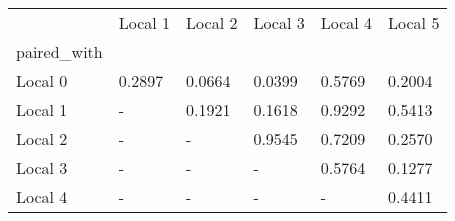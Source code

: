 \begin{tabular}{llllll}
\toprule
 & Local 1 & Local 2 & Local 3 & Local 4 & Local 5 \\
paired_with &  &  &  &  &  \\
\midrule
Local 0 & 0.2897 & 0.0664 & 0.0399 & 0.5769 & 0.2004 \\
Local 1 & - & 0.1921 & 0.1618 & 0.9292 & 0.5413 \\
Local 2 & - & - & 0.9545 & 0.7209 & 0.2570 \\
Local 3 & - & - & - & 0.5764 & 0.1277 \\
Local 4 & - & - & - & - & 0.4411 \\
\bottomrule
\end{tabular}
